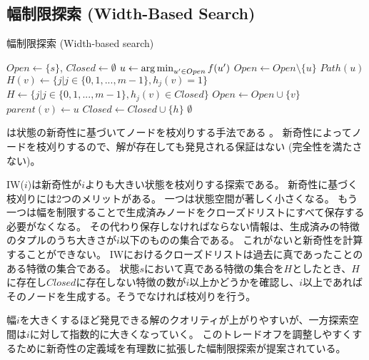 \subsection{幅制限探索 (Width-Based Search)}
\label{sec:width-based-search}


\begin{algorithm}
\caption{幅制限探索 (Width-based search)}
\label{alg:width-based-search}
	$Open \leftarrow \{s\}$, $Closed \leftarrow \emptyset$\;
	 {
                $u \leftarrow \operatorname*{arg\,min}_{u' \in Open} f(u')$ \;
		$Open \leftarrow Open \setminus \{u\} $\;
		 {
			\Return $Path(u)$\;
		}
		 {
                  $H(v) \leftarrow \{j | j \in \{0, 1, ..., m-1\}, h_j(v) = 1\}$\;
                  $H \leftarrow \{j | j \in \{0, 1, ..., m-1\}, h_j(v) \in Closed\}$\;
                   {
                    $Open \leftarrow Open \cup \{v\}$\;
                    $parent(v) \leftarrow u$\;
                  }
                   {
                    $Closed \leftarrow Closed \cup \{h\}$\;
                  }
		}
 	}
	\Return $\emptyset$\;
\end{algorithm}

は状態の新奇性に基づいてノードを枝刈りする手法である \cite{lipovetzkyg12}。
新奇性によってノードを枝刈りするので、解が存在しても発見される保証はない (完全性を満たさない)。

IW($i$)は新奇性が$i$よりも大きい状態を枝刈りする探索である。
新奇性に基づく枝刈りには2つのメリットがある。
一つは状態空間が著しく小さくなる。
もう一つは幅を制限することで生成済みノードをクローズドリストにすべて保存する必要がなくなる。
その代わり保存しなければならない情報は、生成済みの特徴のタプルのうち大きさが$i$以下のものの集合である。
これがないと新奇性を計算することができない。
IWにおけるクローズドリストは過去に真であったことのある特徴の集合である。
状態$s$において真である特徴の集合を$H$としたとき、$H$に存在し$Closed$に存在しない特徴の数が$i$以上かどうかを確認し、$i$以上であればそのノードを生成する。そうでなければ枝刈りを行う。

幅$i$を大きくするほど発見できる解のクオリティが上がりやすいが、一方探索空間は$i$に対して指数的に大きくなっていく。
このトレードオフを調整しやすくするために新奇性の定義域を有理数に拡張した幅制限探索が提案されている\cite{geffner2015}。


